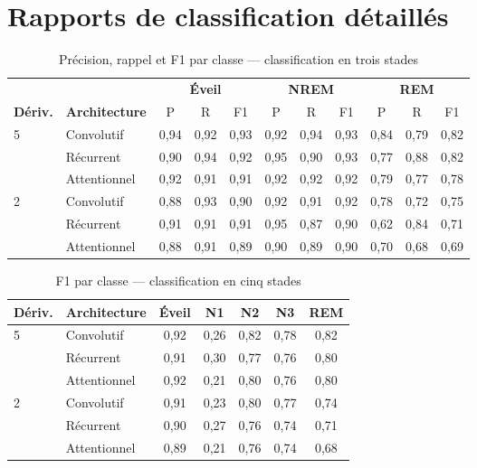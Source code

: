 \clearpage
\section{Rapports de classification détaillés}

\begin{table}[H]
\centering
\caption{Précision, rappel et F1 par classe --- classification en trois stades}
\label{tab:ann-rapport3}
\small
\begin{tabular}{@{}llccccccccc@{}}
\toprule
& & \multicolumn{3}{c}{\textbf{Éveil}} & \multicolumn{3}{c}{\textbf{NREM}} &
\multicolumn{3}{c}{\textbf{REM}} \\
\cmidrule(lr){3-5}\cmidrule(lr){6-8}\cmidrule(lr){9-11}
\textbf{Dériv.} & \textbf{Architecture} & P & R & F1 & P & R & F1 & P & R & F1 \\
\midrule
\multirow{3}{*}{5}
 & Convolutif   & 0,94 & 0,92 & 0,93 & 0,92 & 0,94 & 0,93 & 0,84 & 0,79 & 0,82 \\
 & Récurrent    & 0,90 & 0,94 & 0,92 & 0,95 & 0,90 & 0,93 & 0,77 & 0,88 & 0,82 \\
 & Attentionnel & 0,92 & 0,91 & 0,91 & 0,92 & 0,92 & 0,92 & 0,79 & 0,77 & 0,78 \\
\midrule
\multirow{3}{*}{2}
 & Convolutif   & 0,88 & 0,93 & 0,90 & 0,92 & 0,91 & 0,92 & 0,78 & 0,72 & 0,75 \\
 & Récurrent    & 0,91 & 0,91 & 0,91 & 0,95 & 0,87 & 0,90 & 0,62 & 0,84 & 0,71 \\
 & Attentionnel & 0,88 & 0,91 & 0,89 & 0,90 & 0,89 & 0,90 & 0,70 & 0,68 & 0,69 \\
\bottomrule
\end{tabular}
\end{table}

\begin{table}[H]
\centering
\caption{F1 par classe --- classification en cinq stades}
\label{tab:ann-rapport5}
\small
\begin{tabular}{@{}llccccc@{}}
\toprule
\textbf{Dériv.} & \textbf{Architecture} & \textbf{Éveil} & \textbf{N1} & \textbf{N2} &
\textbf{N3} & \textbf{REM} \\
\midrule
\multirow{3}{*}{5}
 & Convolutif   & 0,92 & \textcolor{hypnored}{0,26} & 0,82 & 0,78 & 0,82 \\
 & Récurrent    & 0,91 & \textcolor{hypnored}{0,30} & 0,77 & 0,76 & 0,80 \\
 & Attentionnel & 0,92 & \textcolor{hypnored}{0,21} & 0,80 & 0,76 & 0,80 \\
\midrule
\multirow{3}{*}{2}
 & Convolutif   & 0,91 & \textcolor{hypnored}{0,23} & 0,80 & 0,77 & 0,74 \\
 & Récurrent    & 0,90 & \textcolor{hypnored}{0,27} & 0,76 & 0,74 & 0,71 \\
 & Attentionnel & 0,89 & \textcolor{hypnored}{0,21} & 0,76 & 0,74 & 0,68 \\
\bottomrule
\end{tabular}
\end{table}

